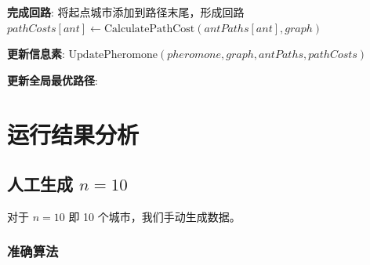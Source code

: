 \begin{algorithm}[htbp]
{{                    \textbf{完成回路}:
                        将起点城市添加到路径末尾，形成回路
                        $pathCosts[ant] \leftarrow \text{CalculatePathCost}(antPaths[ant], graph)$
                }
            
                \textbf{更新信息素}:
                $\text{UpdatePheromone}(pheromone, graph, antPaths, pathCosts)$\;
            
                \textbf{更新全局最优路径}:
            }
            
            \;
            
            \end{algorithm}

\section{运行结果分析}

\subsection{人工生成 $n=10$}

对于 $n=10$ 即 10 个城市，我们手动生成数据。

\subsubsection{准确算法}

